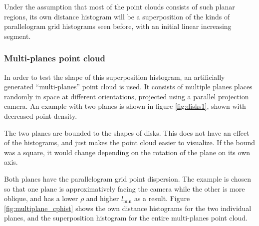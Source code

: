 Under the assumption that most of the point clouds consists of such planar regions, its own distance histogram will be a superposition of the kinds of parallelogram grid histograms seen before, with an initial linear increasing segment.

\subsubsection{Multi-planes point cloud}
In order to test the shape of this superposition histogram, an artificially generated ``multi-planes'' point cloud is used. It consists of multiple planes places randomly in space at different orientations, projected using a parallel projection camera. An example with two planes is shown in figure \ref{fig:disks1}, shown with decreased point density.

The two planes are bounded to the shapes of disks. This does not have an effect of the histograms, and just makes the point cloud easier to visualize. If the bound was a square, it would change depending on the rotation of the plane on its own axis.

Both planes have the parallelogram grid point dispersion. The example is chosen so that one plane is approximatively facing the camera while the other is more oblique, and has a lower $\rho$ and higher $l_\text{min}$ as a result. Figure \ref{fig:multiplane_cphist} shows the own distance histograms for the two individual planes, and the superposition histogram for the entire multi-planes point cloud.

